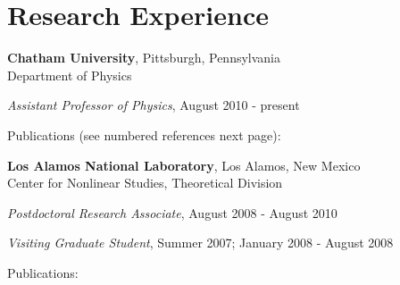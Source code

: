 \section{\sc Research Experience} %


{\bf Chatham University}, Pittsburgh, Pennsylvania\\
Department of Physics
\begin{list1}
\item[] {\em  Assistant Professor of Physics}, August 2010 - present
\item[] Publications (see numbered references next page):  
\end{list1}



{\bf Los Alamos National Laboratory}, Los Alamos, New Mexico\\
Center for Nonlinear Studies, Theoretical Division
\begin{list1}
\item[] {\em Postdoctoral Research Associate}, August 2008 - August 2010
\item[] {\em Visiting Graduate Student}, Summer 2007; January 2008 - August 2008
\item[] Publications:  
\end{list1}

